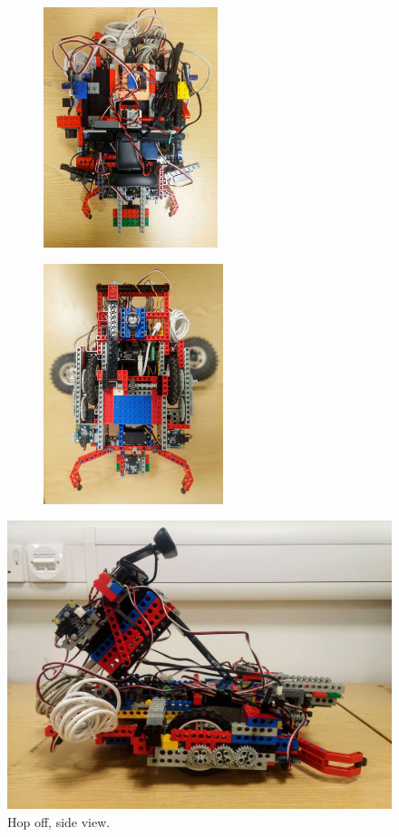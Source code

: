 \begin{figure}[ht]
    \centering
    \begin{subfigure}{0.45\textwidth}
        \includegraphics[width=\linewidth, height=7cm]{res/robot-pics/view-top.jpg}
        \caption{}
        \label{fig:}
    \end{subfigure}
    \begin{subfigure}{0.45\textwidth}
        \includegraphics[width=\linewidth, height=7cm]{res/robot-pics/view-bottom.jpg}
        \caption{}
        \label{fig:}
    \end{subfigure}
    \caption{}
    \label{fig:}
\end{figure}

\begin{figure}[ht]
    \centering
    \includegraphics[width=0.7\linewidth]{res/robot-pics/top-off-side-view.jpg}
    \caption{Hop off, side view.}
    \label{fig:}
\end{figure}

